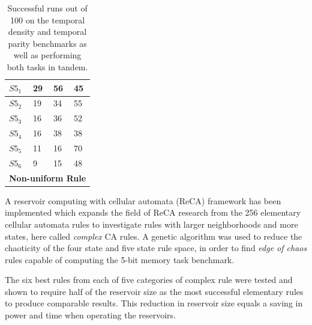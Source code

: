 \documentclass{elsarticle}
\begin{document}
\begin{multicols}{2}
\begin{table}[H]
\begin{tabular}{|l|l|l|l|}
\hline
$S5_{1}$ & 29 & 56 & 45 \\ \hline
$S5_{2}$ & 19 & 34 & 55 \\ \hline
$S5_{3}$ & 16 & 36 & 52 \\ \hline
$S5_{4}$ & 16 & 38 & 38 \\ \hline
$S5_{5}$ & 11 & 16 & 70 \\ \hline
$S5_{6}$ & 9 & 15 & 48 \\ \hline
\multicolumn{4}{|l|}{\textbf{Non-uniform Rule}} \\ \hline
\end{tabular}
\caption{Successful runs out of 100 on the temporal density and temporal parity 
   benchmarks as well as performing both tasks in tandem.
}
\label{table:results_temp_dens}
\end{table}

A reservoir computing with cellular automata (ReCA) framework has been 
implemented which expands the field of ReCA research from the 256 elementary 
cellular automata rules to investigate rules with larger neighborhoods and more 
states, here called \textit{complex} CA rules. A genetic algorithm was used to 
reduce the chaoticity of the four state and five state rule space, in order to 
find \textit{edge of chaos} rules capable of computing the 5-bit memory task 
benchmark. \par The six best rules from each of five categories of complex rule 
were tested and shown to require half of the reservoir size as the most 
successful elementary rules to produce comparable results. This reduction in 
reservoir size equals a saving in power and time when operating the reservoirs.  





\end{multicols}
\end{document}
